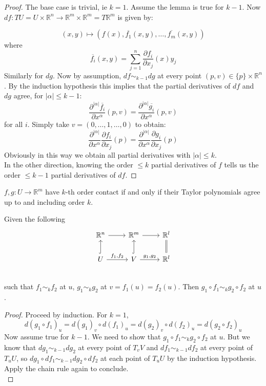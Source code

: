 \documentclass[12pt]{article}
\newcommand{\RR}{\mathbb{R}}
\begin{document}
\begin{proof}
    The base case is trivial, ie $k=1$. Assume the lemma is true for $k-1$. Now $df: TU = U \times \RR^n \to \RR^m \times \RR^m = T\RR^m$ is given by:
    
    $$
    (x, y) \mapsto (f(x), \overline{f_1}(x, y), \dots, \overline{f_m}(x, y))
    $$
    where 
    $$
    \overline{f_i}(x, y) = \sum_{j = 1}^n \frac{\partial f_i}{\partial x_j} (x) y_j
    $$
    Similarly for $dg$. Now by assumption, $df \sim_{k-1} dg$ at every point $(p, v) \in \{p \} \times \RR^n$. By the induction hypothesis this implies that the partial derivatives of $df$ and $dg$ agree, for $|\alpha|\leq k-1$: 
    $$
    \frac{\partial^{|\alpha|} \overline{f_i}}{\partial x^\alpha} (p, v) = \frac{\partial^{|\alpha|} \overline{g_i}}{\partial x^\alpha} (p, v)
    $$
    for all $i$. Simply take $v = (0, \dots, 1, \dots, 0)$ to obtain:
    $$
    \frac{\partial^{|\alpha|} }{\partial x^\alpha} \frac{\partial f_i}{\partial x_j} (p) = \frac{\partial^{|\alpha|} }{\partial x^\alpha} \frac{\partial g_i}{\partial x_j} (p)
    $$
    Obviously in this way we obtain all partial derivatives with $|\alpha| \leq k$. \\
    
    In the other direction, knowing the order $\leq k$ partial derivatives of $f$ tells us the order $\leq k-1$ partial derivatives of $df$. 
\end{proof}

\begin{corollary} \label{taylor corollary}
    $f, g: U \to \RR^m$ have $k$-th order contact if and only if their Taylor polynomials agree up to and including order $k$. 
\end{corollary}

\begin{lemma} \label{well definition}
    Given the following
    $$
    \begin{tikzcd}
    \RR^n \arrow[r] & \RR^m \arrow[r] & \RR^l \\ 
    U \arrow[u, hook] \arrow[r, "{f_1, f_2}"] & V \arrow[u, hook] \arrow[r, "{g_1, g_2}"] & \RR^l \arrow[u, equal] \\ 
    \end{tikzcd}
    $$
    such that $f_1 \sim_k f_2$ at $u$, $g_1 \sim_k g_2$ at $v = f_1(u)=f_2(u)$. Then $g_1 \circ f_1 \sim_k g_2 \circ f_2$ at $u$.  
\end{lemma}

\begin{proof}
    Proceed by induction. For $k=1$, 
    $$
    d(g_1\circ f_1)_u = d(g_1)_v \circ d(f_1)_u = d(g_2)_v \circ d(f_2)_u = d(g_2\circ f_2)_u 
    $$
    Now assume true for $k-1$. We need to show that $g_1 \circ f_1 \sim_k g_2 \circ f_2$ at $u$. But we know that $dg_1 \sim_{k-1} dg_2$ at every point of $T_v V$ and $df_1 \sim_{k-1} df_2$ at every point of $T_u U$, so $dg_1 \circ df_1 \sim_{k-1} dg_2 \circ df_2$ at each point of $T_u U$ by the induction hypothesis. Apply the chain rule again to conclude. \\
\end{proof}
\end{document}

